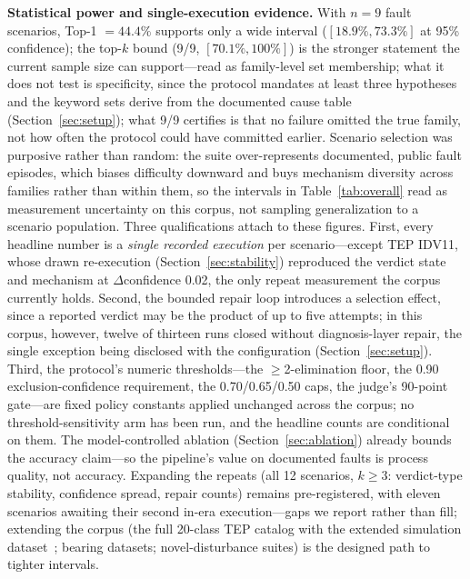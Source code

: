 \documentclass[preprint,12pt]{elsarticle}
\begin{document}
\textbf{Statistical power and single-execution evidence.} With $n{=}9$ fault scenarios, Top-1 $=44.4\%$ supports only a wide interval ($[18.9\%,73.3\%]$ at 95\% confidence); the top-$k$ bound (9/9, $[70.1\%,100\%]$) is the stronger statement the current sample size can support---read as family-level set membership; what it does not test is specificity, since the protocol mandates at least three hypotheses and the keyword sets derive from the documented cause table (Section~\ref{sec:setup}); what 9/9 certifies is that no failure omitted the true family, not how often the protocol could have committed earlier. Scenario selection was purposive rather than random: the suite over-represents documented, public fault episodes, which biases difficulty downward and buys mechanism diversity across families rather than within them, so the intervals in Table~\ref{tab:overall} read as measurement uncertainty on this corpus, not sampling generalization to a scenario population. Three qualifications attach to these figures. First, every headline number is a \emph{single recorded execution} per scenario---except TEP IDV11, whose drawn re-execution (Section~\ref{sec:stability}) reproduced the verdict state and mechanism at $\Delta$confidence 0.02, the only repeat measurement the corpus currently holds. Second, the bounded repair loop introduces a selection effect, since a reported verdict may be the product of up to five attempts; in this corpus, however, twelve of thirteen runs closed without diagnosis-layer repair, the single exception being disclosed with the configuration (Section~\ref{sec:setup}). Third, the protocol's numeric thresholds---the $\ge$2-elimination floor, the 0.90 exclusion-confidence requirement, the 0.70/0.65/0.50 caps, the judge's 90-point gate---are fixed policy constants applied unchanged across the corpus; no threshold-sensitivity arm has been run, and the headline counts are conditional on them. The model-controlled ablation (Section~\ref{sec:ablation}) already bounds the accuracy claim---so the pipeline's value on documented faults is process quality, not accuracy. Expanding the repeats (all 12 scenarios, $k\ge3$: verdict-type stability, confidence spread, repair counts) remains pre-registered, with eleven scenarios awaiting their second in-era execution---gaps we report rather than fill; extending the corpus (the full 20-class TEP catalog with the extended simulation dataset~\cite{reinartz2021extended}; bearing datasets; novel-disturbance suites) is the designed path to tighter intervals.
\end{document}
